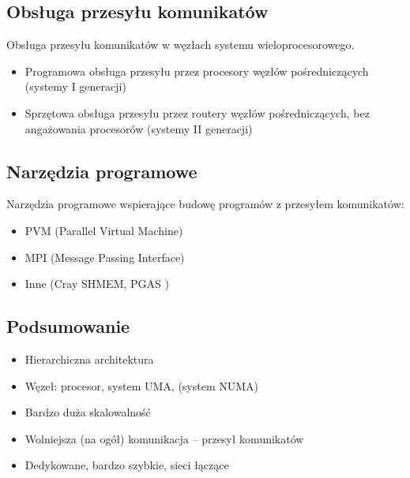 \documentclass[a4paper,twoside]{article}
\begin{document}
\subsection{Obsługa przesyłu komunikatów}
Obsługa przesyłu komunikatów w węzłach systemu wieloprocesorowego.
\begin{itemize}
	\item Programowa obsługa przesyłu przez procesory węzłów pośredniczących (systemy I generacji)
	\item Sprzętowa obsługa przesyłu przez routery węzłów pośredniczących, bez angażowania procesorów (systemy II generacji)
\end{itemize}
\subsection{Narzędzia programowe}
Narzędzia programowe wspierające budowę programów z przesyłem komunikatów:
\begin{itemize}
	\item PVM (Parallel Virtual Machine)
	\item MPI (Message Passing Interface)
	\item Inne (Cray SHMEM, PGAS )
\end{itemize}
\subsection{Podsumowanie}
\begin{itemize}
	\item Hierarchiczna architektura
	\item Węzeł: procesor, system UMA, (system NUMA)
	\item Bardzo duża skalowalność
	\item Wolniejsza (na ogół) komunikacja – przesył komunikatów
	\item Dedykowane, bardzo szybkie, sieci łączące
\end{itemize}
\vfill
\end{document}
